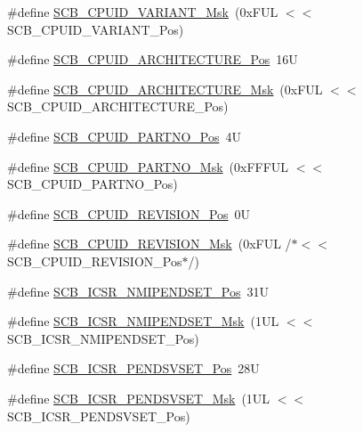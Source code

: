 \begin{DoxyCompactItemize}
\#define \hyperlink{group___c_m_s_i_s___s_c_b_gad358dfbd04300afc1824329d128b99e8}{S\-C\-B\-\_\-\-C\-P\-U\-I\-D\-\_\-\-V\-A\-R\-I\-A\-N\-T\-\_\-\-Msk}~(0x\-F\-U\-L $<$$<$ S\-C\-B\-\_\-\-C\-P\-U\-I\-D\-\_\-\-V\-A\-R\-I\-A\-N\-T\-\_\-\-Pos)
\item 
\#define \hyperlink{group___c_m_s_i_s___s_c_b_gaf8b3236b08fb8e840efb682645fb0e98}{S\-C\-B\-\_\-\-C\-P\-U\-I\-D\-\_\-\-A\-R\-C\-H\-I\-T\-E\-C\-T\-U\-R\-E\-\_\-\-Pos}~16\-U
\item 
\#define \hyperlink{group___c_m_s_i_s___s_c_b_gafae4a1f27a927338ae9dc51a0e146213}{S\-C\-B\-\_\-\-C\-P\-U\-I\-D\-\_\-\-A\-R\-C\-H\-I\-T\-E\-C\-T\-U\-R\-E\-\_\-\-Msk}~(0x\-F\-U\-L $<$$<$ S\-C\-B\-\_\-\-C\-P\-U\-I\-D\-\_\-\-A\-R\-C\-H\-I\-T\-E\-C\-T\-U\-R\-E\-\_\-\-Pos)
\item 
\#define \hyperlink{group___c_m_s_i_s___s_c_b_ga705f68eaa9afb042ca2407dc4e4629ac}{S\-C\-B\-\_\-\-C\-P\-U\-I\-D\-\_\-\-P\-A\-R\-T\-N\-O\-\_\-\-Pos}~4\-U
\item 
\#define \hyperlink{group___c_m_s_i_s___s_c_b_ga98e581423ca016680c238c469aba546d}{S\-C\-B\-\_\-\-C\-P\-U\-I\-D\-\_\-\-P\-A\-R\-T\-N\-O\-\_\-\-Msk}~(0x\-F\-F\-F\-U\-L $<$$<$ S\-C\-B\-\_\-\-C\-P\-U\-I\-D\-\_\-\-P\-A\-R\-T\-N\-O\-\_\-\-Pos)
\item 
\#define \hyperlink{group___c_m_s_i_s___s_c_b_ga3c3d9071e574de11fb27ba57034838b1}{S\-C\-B\-\_\-\-C\-P\-U\-I\-D\-\_\-\-R\-E\-V\-I\-S\-I\-O\-N\-\_\-\-Pos}~0\-U
\item 
\#define \hyperlink{group___c_m_s_i_s___s_c_b_ga2ec0448b6483f77e7f5d08b4b81d85df}{S\-C\-B\-\_\-\-C\-P\-U\-I\-D\-\_\-\-R\-E\-V\-I\-S\-I\-O\-N\-\_\-\-Msk}~(0x\-F\-U\-L /$\ast$$<$$<$ S\-C\-B\-\_\-\-C\-P\-U\-I\-D\-\_\-\-R\-E\-V\-I\-S\-I\-O\-N\-\_\-\-Pos$\ast$/)
\item 
\#define \hyperlink{group___c_m_s_i_s___s_c_b_ga750d4b52624a46d71356db4ea769573b}{S\-C\-B\-\_\-\-I\-C\-S\-R\-\_\-\-N\-M\-I\-P\-E\-N\-D\-S\-E\-T\-\_\-\-Pos}~31\-U
\item 
\#define \hyperlink{group___c_m_s_i_s___s_c_b_ga340e3f79e9c3607dee9f2c048b6b22e8}{S\-C\-B\-\_\-\-I\-C\-S\-R\-\_\-\-N\-M\-I\-P\-E\-N\-D\-S\-E\-T\-\_\-\-Msk}~(1\-U\-L $<$$<$ S\-C\-B\-\_\-\-I\-C\-S\-R\-\_\-\-N\-M\-I\-P\-E\-N\-D\-S\-E\-T\-\_\-\-Pos)
\item 
\#define \hyperlink{group___c_m_s_i_s___s_c_b_gab5ded23d2ab1d5ff7cc7ce746205e9fe}{S\-C\-B\-\_\-\-I\-C\-S\-R\-\_\-\-P\-E\-N\-D\-S\-V\-S\-E\-T\-\_\-\-Pos}~28\-U
\item 
\#define \hyperlink{group___c_m_s_i_s___s_c_b_ga1e40d93efb402763c8c00ddcc56724ff}{S\-C\-B\-\_\-\-I\-C\-S\-R\-\_\-\-P\-E\-N\-D\-S\-V\-S\-E\-T\-\_\-\-Msk}~(1\-U\-L $<$$<$ S\-C\-B\-\_\-\-I\-C\-S\-R\-\_\-\-P\-E\-N\-D\-S\-V\-S\-E\-T\-\_\-\-Pos)
$$
\end{DoxyCompactItemize}

